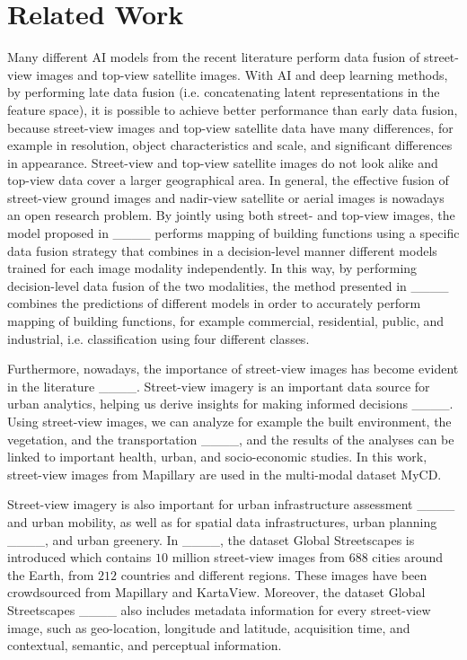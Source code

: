 \section{Related Work}
\label{sec:rel}                           
Many different AI models from the recent literature perform data fusion of street-view images and top-view satellite images.         
With AI and deep learning methods, by performing late data fusion (i.e. concatenating latent representations in the feature space), it is possible to achieve better performance than early data fusion, because street-view images and top-view satellite data have many differences, for example in resolution, object characteristics and scale, and significant differences in appearance.   
Street-view and top-view satellite images do not look alike and top-view data cover a larger geographical area.  
In general, the effective fusion of street-view ground images and nadir-view satellite or aerial images is nowadays an open research problem.       
By jointly using both street- and top-view images, the model proposed in ____ performs mapping of building functions using a specific data fusion strategy that combines in a decision-level manner different models trained for each image modality independently.         
In this way, by performing decision-level data fusion of the two modalities, the method presented in ____ combines the predictions of different models in order to accurately perform mapping of building functions, for example commercial, residential, public, and industrial, i.e. classification using four different classes.

Furthermore, nowadays, the importance of street-view images has become evident in the literature ____.    
Street-view imagery is an important data source for urban analytics, helping us derive insights for making informed decisions ____.   
Using street-view images, we can analyze for example the built environment, the vegetation, and the transportation ____, and the results of the analyses can be linked to important health, urban, and socio-economic studies.    
In this work, street-view images from Mapillary are used in the multi-modal dataset MyCD.

Street-view imagery is also important for urban infrastructure assessment ____ and urban mobility, as well as for spatial data infrastructures, urban planning ____, and urban greenery.  
In ____, the dataset Global Streetscapes is introduced which contains $10$ million street-view images from $688$ cities around the Earth, from $212$ countries and different regions.     
These images have been crowdsourced from Mapillary and KartaView.         
Moreover, the dataset Global Streetscapes ____ also includes metadata information for every street-view image, such as geo-location, longitude and latitude, acquisition time, and contextual, semantic, and perceptual information.

